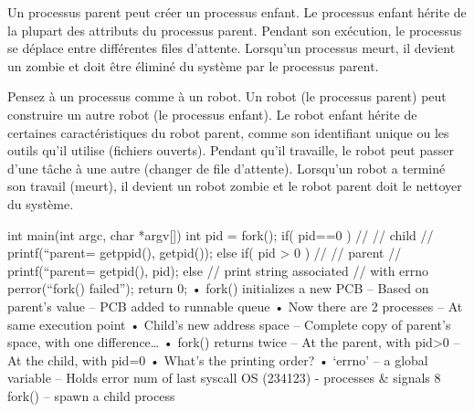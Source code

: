 \documentclass[12pt]{report}
\begin{document}
\begin{tcolorbox}[colback=yellow!5, colframe=yellow!80!black, title={\faBookmark À retenir}]Un processus parent peut créer un processus enfant. Le processus enfant hérite de la plupart des attributs du processus parent. Pendant son exécution, le processus se déplace entre différentes files d'attente. Lorsqu'un processus meurt, il devient un zombie et doit être éliminé du système par le processus parent.\end{tcolorbox}
\begin{tcolorbox}[colback=blue!5, colframe=blue!75!black, title={\faLightbulb Vulgarisation simple}]Pensez à un processus comme à un robot. Un robot (le processus parent) peut construire un autre robot (le processus enfant). Le robot enfant hérite de certaines caractéristiques du robot parent, comme son identifiant unique ou les outils qu'il utilise (fichiers ouverts). Pendant qu'il travaille, le robot peut passer d'une tâche à une autre (changer de file d'attente). Lorsqu'un robot a terminé son travail (meurt), il devient un robot zombie et le robot parent doit le nettoyer du système.\end{tcolorbox}

int main(int argc, char *argv[])
{
  int pid = fork();
  if( pid==0 ) { 
   //
   // child
      //
      printf(“parent=%
             getppid(), getpid());
  }
  else if( pid > 0 ) {
      //
      // parent
      //
      printf(“parent=%
             getpid(), pid);
  }
  else { // print string associated
         // with errno   
      perror(“fork() failed”); 
  }
  return 0;
}
• fork() initializes a new PCB
– Based on parent’s value
– PCB added to runnable queue
• Now there are 2 processes
– At same execution point
• Child’s new address space 
– Complete copy of parent’s 
space, with one difference…
• fork() returns twice
– At the parent, with pid>0
– At the child, with pid=0
• What’s the printing order?
• ‘errno’ – a global variable
– Holds error num of last syscall
OS (234123) - processes & signals
8
fork() – spawn a child process
\end{document}
